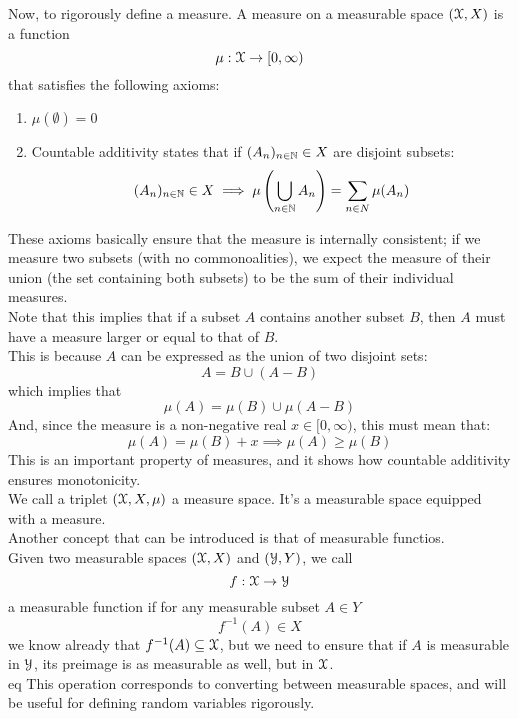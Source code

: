 \documentclass[12pt]{article}
\begin{document}
    Now, to rigorously define a measure.
    A measure on a measurable space $(\mathcal{X}, X)$
    is a function
    \[ \mu: \mathcal{X} \to [0, \infty) \]
    that satisfies the following axioms:     
    \begin{enumerate}
        \item 
        $\mu(\emptyset) = 0$
        \item 
        Countable additivity states that if
        $(A_n)_{n \in \mathbb{N}} \in X$ are disjoint subsets:
        \[ (A_n)_{n \in \mathbb{N}} \in X \implies 
        \mu\left( \bigcup_{n \in \mathbb{N}}A_n \right) 
        = \sum_{n \in N} \mu(A_n) \]
    \end{enumerate}
    These axioms basically ensure that the measure
    is internally consistent;
    if we measure two subsets (with no commonoalities),
    we expect the measure of their union
    (the set containing both subsets)
    to be the sum of their individual measures. \\

    Note that this implies that if a subset $A$
    contains another subset $B$,
    then $A$ must have a measure larger
    or equal to that of $B$. \\
    This is because $A$ can be expressed
    as the union of two disjoint sets:
    \[ A = B \cup (A-B) \]
    which implies that
    \[ \mu(A) = \mu(B) \cup \mu(A-B) \]
    And, since the measure is a non-negative
    real $x \in [0, \infty)$,
    this must mean that:
    \[ \mu(A) = \mu(B) + x 
    \implies \mu(A) \geq \mu(B) \]
    This is an important property of measures,
    and it shows how countable additivity
    ensures monotonicity. \\

    We call a triplet $(\mathcal{X}, X, \mu)$
    a measure space.
    It's a measurable space equipped with a measure. \\

    Another concept that can be introduced is that
    of measurable functios. \\
    Given two measurable spaces 
    $(\mathcal{X}, X)$ and $(\mathcal{Y}, Y)$,
    we call
    \[ f: \mathcal{X} \to \mathcal{Y} \]
    a measurable function if
    for any measurable subset $A \in Y$
    \[ f^{-1}(A) \in X \]
    we know already that $f^{-1}(A) \subseteq \mathcal{X}$,
    but we need to ensure that if $A$ is measurable
    in $\mathcal{Y}$,
    its preimage is as measurable as well,
    but in $\mathcal{X}$. \\eq
    This operation corresponds to converting
    between measurable spaces,
    and will be useful for defining
    random variables rigorously. \\
\end{document}
